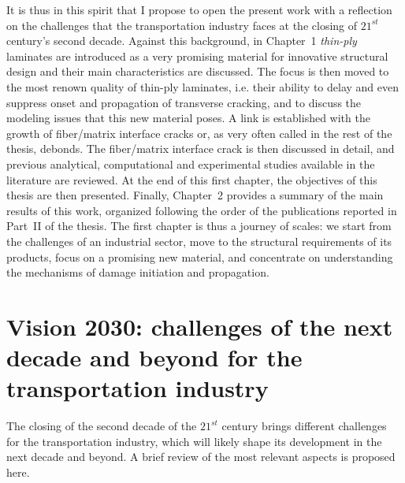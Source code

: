 It is thus in this spirit that I propose to open the present work with a reflection on the challenges that the transportation industry faces at the closing of $21^{st}$ century's second decade. Against this background, in Chapter~1 \emph{thin-ply} laminates are introduced as a very promising material for innovative structural design and their main characteristics are discussed. The focus is then moved to the most renown quality of thin-ply laminates, i.e. their ability to delay and even suppress onset and propagation of transverse cracking, and to discuss the modeling issues that this new material poses. A link is established with the growth of fiber/matrix interface cracks or, as very often called in the rest of the thesis, debonds. The fiber/matrix interface crack is then discussed in detail, and previous analytical, computational and experimental studies available in the literature are reviewed. At the end of this first chapter, the objectives of this thesis are then presented. Finally, Chapter~2 provides a summary of the main results of this work, organized following the order of the publications reported in Part~II of the thesis. The first chapter is thus a journey of scales: we start from the challenges of an industrial sector, move to the structural requirements of its products, focus on a promising new material, and concentrate on understanding the mechanisms of damage initiation and propagation.

\section{Vision 2030: challenges of the next decade and beyond for the transportation industry}

The closing of the second decade of the $21^{st}$ century brings different challenges for the transportation industry, which will likely shape its development in the next decade and beyond. A brief review of the most relevant aspects is proposed here.

